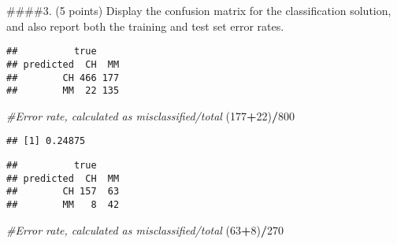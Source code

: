 \documentclass[]{article}
\newenvironment{Shaded}{\begin{snugshade}}{\end{snugshade}}
\newcommand{\CommentTok}[1]{\textcolor[rgb]{0.56,0.35,0.01}{\textit{#1}}}
\newcommand{\DataTypeTok}[1]{\textcolor[rgb]{0.13,0.29,0.53}{#1}}
\newcommand{\DecValTok}[1]{\textcolor[rgb]{0.00,0.00,0.81}{#1}}
\newcommand{\KeywordTok}[1]{\textcolor[rgb]{0.13,0.29,0.53}{\textbf{#1}}}
\newcommand{\NormalTok}[1]{#1}
\newcommand{\OperatorTok}[1]{\textcolor[rgb]{0.81,0.36,0.00}{\textbf{#1}}}
\newcommand{\StringTok}[1]{\textcolor[rgb]{0.31,0.60,0.02}{#1}}
\begin{document}
\#\#\#\#3. (5 points) Display the confusion matrix for the
classification solution, and also report both the training and test set
error rates.

\begin{Shaded}
\end{Shaded}

\begin{verbatim}
##          true
## predicted  CH  MM
##        CH 466 177
##        MM  22 135
\end{verbatim}

\begin{Shaded}
\begin{Highlighting}[]
\CommentTok{#Error rate, calculated as misclassified/total}
\NormalTok{(}\DecValTok{177}\OperatorTok{+}\DecValTok{22}\NormalTok{)}\OperatorTok{/}\DecValTok{800}
\end{Highlighting}
\end{Shaded}

\begin{verbatim}
## [1] 0.24875
\end{verbatim}

\begin{Shaded}
\end{Shaded}

\begin{verbatim}
##          true
## predicted  CH  MM
##        CH 157  63
##        MM   8  42
\end{verbatim}

\begin{Shaded}
\begin{Highlighting}[]
\CommentTok{#Error rate, calculated as misclassified/total}
\NormalTok{(}\DecValTok{63}\OperatorTok{+}\DecValTok{8}\NormalTok{)}\OperatorTok{/}\DecValTok{270}
\end{Highlighting}
\end{Shaded}
\end{document}
